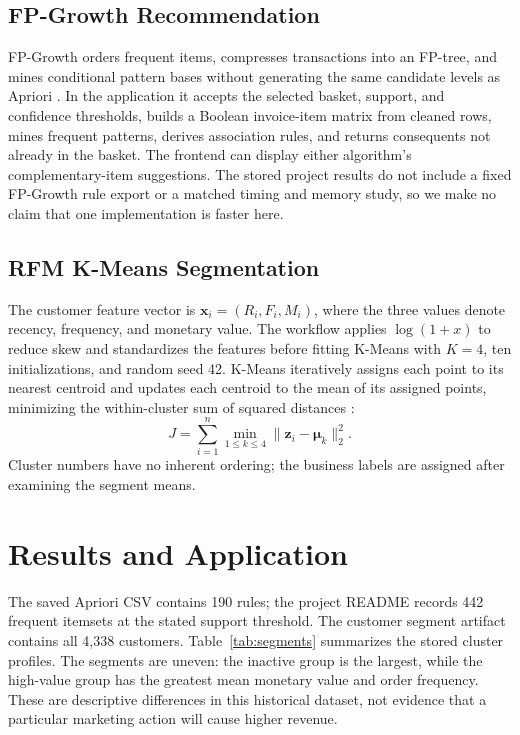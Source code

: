 \documentclass[10pt,conference]{IEEEtran}
\begin{document}
\subsection{FP-Growth Recommendation}
FP-Growth orders frequent items, compresses transactions into an FP-tree, and mines conditional pattern bases without generating the same candidate levels as Apriori \cite{han}. In the application it accepts the selected basket, support, and confidence thresholds, builds a Boolean invoice-item matrix from cleaned rows, mines frequent patterns, derives association rules, and returns consequents not already in the basket. The frontend can display either algorithm's complementary-item suggestions. The stored project results do not include a fixed FP-Growth rule export or a matched timing and memory study, so we make no claim that one implementation is faster here.

\subsection{RFM K-Means Segmentation}
The customer feature vector is $\mathbf{x}_i=(R_i,F_i,M_i)$, where the three values denote recency, frequency, and monetary value. The workflow applies $\log(1+x)$ to reduce skew and standardizes the features before fitting K-Means with $K=4$, ten initializations, and random seed 42. K-Means iteratively assigns each point to its nearest centroid and updates each centroid to the mean of its assigned points, minimizing the within-cluster sum of squared distances \cite{macqueen}:
\begin{equation}
J=\sum_{i=1}^{n}\min_{1\leq k\leq4}\|\mathbf{z}_i-\boldsymbol{\mu}_k\|_2^2.
\end{equation}
Cluster numbers have no inherent ordering; the business labels are assigned after examining the segment means.

\section{Results and Application}
The saved Apriori CSV contains 190 rules; the project README records 442 frequent itemsets at the stated support threshold. The customer segment artifact contains all 4,338 customers. Table~\ref{tab:segments} summarizes the stored cluster profiles. The segments are uneven: the inactive group is the largest, while the high-value group has the greatest mean monetary value and order frequency. These are descriptive differences in this historical dataset, not evidence that a particular marketing action will cause higher revenue.
\end{document}
